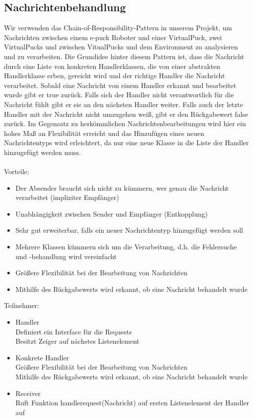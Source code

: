 \documentclass[10pt,a4paper]{article}
\begin{document}
  		\subsection{Nachrichtenbehandlung}
  			Wir verwenden das Chain-of-Responsibility-Pattern in unserem Projekt, um Nachrichten zwischen einem e-puck Roboter und einer
  			VirtualPuck, zwei VirtualPucks und zwischen VitualPucks und dem Environment zu analysieren und zu verarbeiten. Die Grundidee hinter
  			diesem Pattern ist, dass die Nachricht durch eine Liste
  			von konkreten Handlerklassen, die von einer abstrakten Handlerklasse erben, gereicht wird und der richtige Handler die Nachricht
  			verarbeitet. Sobald eine Nachricht von einem Handler erkannt und bearbeitet wurde gibt er true zurück. Falls sich der Handler nicht
  			verantwortlich für die Nachricht fühlt gibt er sie an den nächsten Handler weiter. Falls auch der letzte Handler mit der Nachricht nicht
  			umzugehen weiß, gibt er den Rückgabewert false zurück. Im Gegensatz zu herkömmlichen Nachrichtenbearbeitungen wird hier ein
  			hohes Maß an Flexibilität erreicht und das Hinzufügen eines neuen Nachrichtentyps wird erleichtert, da nur eine neue Klasse in die
  			Liste der Handler hinzugefügt werden muss. \\ \\
  			Vorteile:
  			\begin{itemize}
  				\item Der Absender braucht sich nicht zu kümmern, wer genau die Nachricht verarbeitet (impliziter Empfänger)
  				\item Unabhängigkeit zwischen Sender und Empfänger (Entkopplung)
  				\item Sehr gut erweiterbar, falls ein neuer Nachrichtentyp hinzugefügt werden soll
  				\item Mehrere Klassen kümmern sich um die Verarbeitung, d.h. die Fehlersuche und -behandlung wird vereinfacht
  				\item Größere Flexibilität bei der Bearbeitung von Nachrichten
  				\item Mithilfe des Rückgabewerts wird erkannt, ob eine Nachricht behandelt wurde
  			\end{itemize}  
  			Teilnehmer:
   			\begin{itemize}
  				\item Handler\\Definiert ein Interface für die Requests\\Besitzt Zeiger auf nächstes Listenelement
  				\item Konkrete Handler\\Größere Flexibilität bei der Bearbeitung von Nachrichten\\
  					Mithilfe des Rückgabewerts wird erkannt, ob eine Nachricht behandelt wurde
  				\item Receiver \\ Ruft Funktion handlerequest(Nachricht) auf ersten Listenelement der Handler auf
  			\end{itemize}   	
\end{document}
